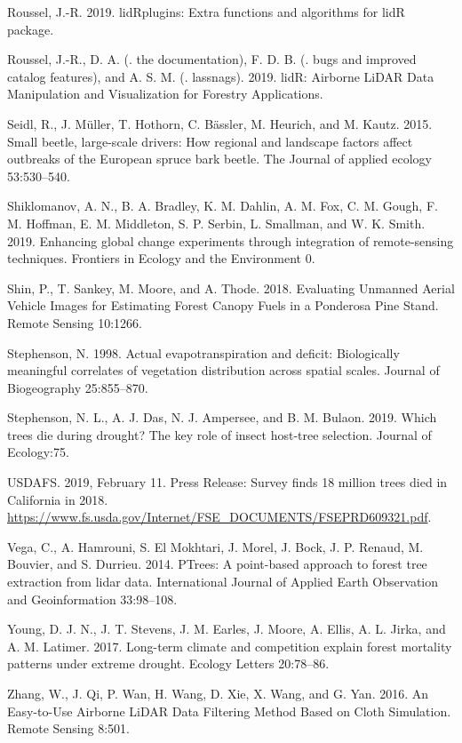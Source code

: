 \documentclass[]{article}
\begin{document}
\hypertarget{ref-roussel2019a}{}
Roussel, J.-R. 2019. lidRplugins: Extra functions and algorithms for
lidR package.

\hypertarget{ref-roussel2019}{}
Roussel, J.-R., D. A. (. the documentation), F. D. B. (. bugs and
improved catalog features), and A. S. M. (. lassnags). 2019. lidR:
Airborne LiDAR Data Manipulation and Visualization for Forestry
Applications.

\hypertarget{ref-seidl2015}{}
Seidl, R., J. Müller, T. Hothorn, C. Bässler, M. Heurich, and M. Kautz.
2015. Small beetle, large-scale drivers: How regional and landscape
factors affect outbreaks of the European spruce bark beetle. The Journal
of applied ecology 53:530--540.

\hypertarget{ref-shiklomanov2019}{}
Shiklomanov, A. N., B. A. Bradley, K. M. Dahlin, A. M. Fox, C. M. Gough,
F. M. Hoffman, E. M. Middleton, S. P. Serbin, L. Smallman, and W. K.
Smith. 2019. Enhancing global change experiments through integration of
remote-sensing techniques. Frontiers in Ecology and the Environment 0.

\hypertarget{ref-shin2018}{}
Shin, P., T. Sankey, M. Moore, and A. Thode. 2018. Evaluating Unmanned
Aerial Vehicle Images for Estimating Forest Canopy Fuels in a Ponderosa
Pine Stand. Remote Sensing 10:1266.

\hypertarget{ref-stephenson1998}{}
Stephenson, N. 1998. Actual evapotranspiration and deficit: Biologically
meaningful correlates of vegetation distribution across spatial scales.
Journal of Biogeography 25:855--870.

\hypertarget{ref-stephenson2019}{}
Stephenson, N. L., A. J. Das, N. J. Ampersee, and B. M. Bulaon. 2019.
Which trees die during drought? The key role of insect host-tree
selection. Journal of Ecology:75.

\hypertarget{ref-usdafs2019}{}
USDAFS. 2019, February 11. Press Release: Survey finds 18 million trees
died in California in 2018.
\url{https://www.fs.usda.gov/Internet/FSE_DOCUMENTS/FSEPRD609321.pdf}.

\hypertarget{ref-vega2014}{}
Vega, C., A. Hamrouni, S. El Mokhtari, J. Morel, J. Bock, J. P. Renaud,
M. Bouvier, and S. Durrieu. 2014. PTrees: A point-based approach to
forest tree extraction from lidar data. International Journal of Applied
Earth Observation and Geoinformation 33:98--108.

\hypertarget{ref-young2017}{}
Young, D. J. N., J. T. Stevens, J. M. Earles, J. Moore, A. Ellis, A. L.
Jirka, and A. M. Latimer. 2017. Long-term climate and competition
explain forest mortality patterns under extreme drought. Ecology Letters
20:78--86.

\hypertarget{ref-zhang2016}{}
Zhang, W., J. Qi, P. Wan, H. Wang, D. Xie, X. Wang, and G. Yan. 2016. An
Easy-to-Use Airborne LiDAR Data Filtering Method Based on Cloth
Simulation. Remote Sensing 8:501.
\end{document}
